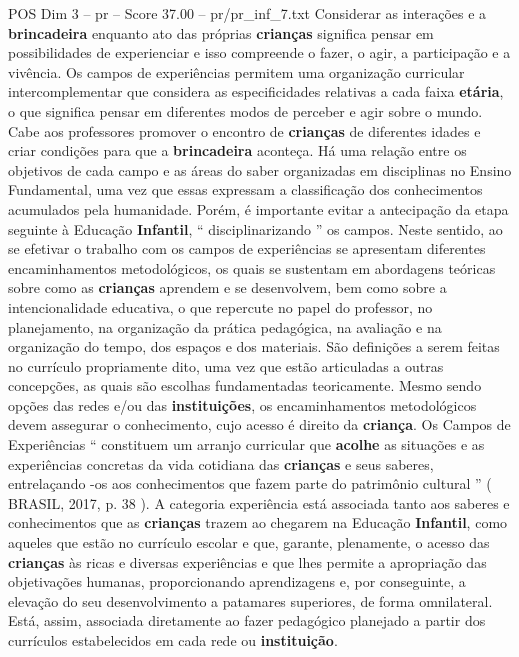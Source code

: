 \begin{textsample}{POS Dim 3 – pr – Score 37.00 – pr/pr\_inf\_7.txt}  \label{ex:f3_pos_151}
Considerar as interações e a \textbf{brincadeira} enquanto ato das próprias \textbf{crianças} significa pensar em possibilidades de experienciar e isso compreende o fazer, o agir, a participação e a vivência.
Os campos de experiências permitem uma organização curricular intercomplementar que considera as especificidades relativas a cada faixa \textbf{etária}, o que significa pensar em diferentes modos de perceber e agir sobre o mundo.
Cabe aos professores promover o encontro de \textbf{crianças} de diferentes idades e criar condições para que a \textbf{brincadeira} aconteça.
Há uma relação entre os objetivos de cada campo e as áreas do saber organizadas em disciplinas no Ensino Fundamental, uma vez que essas expressam a classificação dos conhecimentos acumulados pela humanidade.
Porém, é importante evitar a antecipação da etapa seguinte à Educação \textbf{Infantil}, “ disciplinarizando ” os campos.
Neste sentido, ao se efetivar o trabalho com os campos de experiências se apresentam diferentes encaminhamentos metodológicos, os quais se sustentam em abordagens teóricas sobre como as \textbf{crianças} aprendem e se desenvolvem, bem como sobre a intencionalidade educativa, o que repercute no papel do professor, no planejamento, na organização da prática pedagógica, na avaliação e na organização do tempo, dos espaços e dos materiais.
São definições a serem feitas no currículo propriamente dito, uma vez que estão articuladas a outras concepções, as quais são escolhas fundamentadas teoricamente.
Mesmo sendo opções das redes e/ou das \textbf{instituições}, os encaminhamentos metodológicos devem assegurar o conhecimento, cujo acesso é direito da \textbf{criança}.
Os Campos de Experiências “ constituem um arranjo curricular que \textbf{acolhe} as situações e as experiências concretas da vida cotidiana das \textbf{crianças} e seus saberes, entrelaçando -os aos conhecimentos que fazem parte do patrimônio cultural ” ( BRASIL, 2017, p. 38 ).
A categoria experiência está associada tanto aos saberes e conhecimentos que as \textbf{crianças} trazem ao chegarem na Educação \textbf{Infantil}, como aqueles que estão no currículo escolar e que, garante, plenamente, o acesso das \textbf{crianças} às ricas e diversas experiências e que lhes permite a apropriação das objetivações humanas, proporcionando aprendizagens e, por conseguinte, a elevação do seu desenvolvimento a patamares superiores, de forma omnilateral.
Está, assim, associada diretamente ao fazer pedagógico planejado a partir dos currículos estabelecidos em cada rede ou \textbf{instituição}.

\end{textsample}

